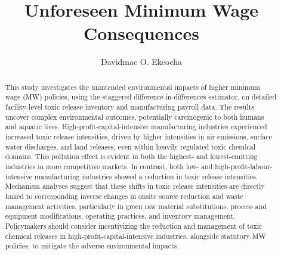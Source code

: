 \documentclass{C:/Users/david/OneDrive/Documents/ULMS/PhD/Thesis/chapter3/src/climate_change/latex/Economic_Journal/OUP-EJ}
\begin{document}
    \title[Minimum Wage and Toxic Releases]{Unforeseen Minimum Wage Consequences}
    \author[1,*]{Davidmac O. Ekeocha}
    \begin{abstract}
        \noindent This study investigates the unintended environmental impacts of higher minimum wage (MW) policies, using the staggered difference-in-differences estimator, on detailed facility-level toxic release inventory and manufacturing payroll data. The results uncover complex environmental outcomes, potentially carcinogenic to both humans and aquatic lives. High-profit-capital-intensive manufacturing industries experienced increased toxic release intensities, driven by higher intensities in air emissions, surface water discharges, and land releases, even within heavily regulated toxic chemical domains. This pollution effect is evident in both the highest- and lowest-emitting industries in more competitive markets. In contrast, both low- and high-profit-labour-intensive manufacturing industries showed a reduction in toxic release intensities. Mechanism analyses suggest that these shifts in toxic release intensities are directly linked to corresponding inverse changes in onsite source reduction and waste management activities, particularly in green raw material substitutions, process and equipment modifications, operating practices, and inventory management. Policymakers should consider incentivizing the reduction and management of toxic chemical releases in high-profit-capital-intensive industries, alongside statutory MW policies, to mitigate the adverse environmental impacts.
    \end{abstract}
    \maketitle
\end{document}
